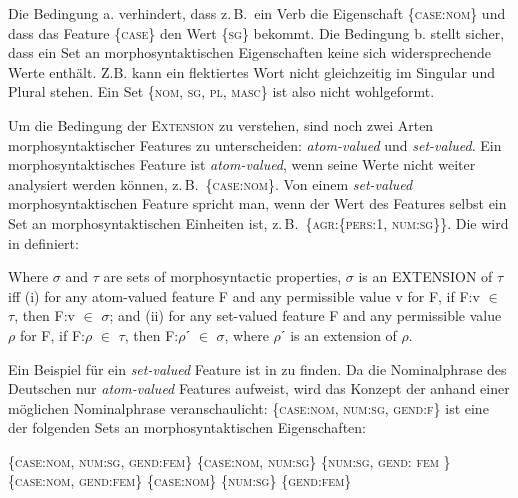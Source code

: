 Die Bedingung a. verhindert, dass z.\,B.\ ein Verb die Eigenschaft \{\textsc{case:nom}\} und dass das Feature \{\textsc{case}\} den Wert \{\textsc{sg}\} bekommt. Die Bedingung b. stellt sicher, dass ein Set an morphosyntaktischen Eigenschaften keine sich widersprechende Werte enthält. Z.B. kann ein flektiertes Wort nicht gleichzeitig im Singular und Plural stehen. Ein Set \{\textsc{nom, sg, pl, masc}\} ist also nicht wohlgeformt.

Um die Bedingung der \textsc{Extension} zu verstehen, sind noch zwei Arten morphosyntaktischer Features zu unterscheiden: \textit{atom-valued} und \textit{set-valued}. Ein morphosyntaktisches Feature ist \textit{atom-valued}, wenn seine Werte nicht weiter analysiert werden können, z.\,B.\ \{\textsc{case:nom}\}. Von einem \textit{set-valued} morphosyntaktischen Feature spricht man, wenn der Wert des Features selbst ein Set an morphosyntaktischen Einheiten ist, z.\,B.\ \{\textsc{agr:}\{\textsc{pers:1}, \textsc{num:sg}\}\}. Die  wird in  definiert:

\ea%
    \label{ex:key:17}
Where $\sigma $ and $\tau $ are  sets of morphosyntactic properties, $\sigma $ is an EXTENSION of $\tau $ iff (i) for any atom-valued feature F and any permissible value v for F, if F:v ${\in}$ $\tau $, then F:v ${\in}$ $\sigma $; and (ii) for any set-valued feature F and any permissible value $\rho $ for F, if F:$\rho $ ${\in}$ $\tau $, then F:$\rho $ˊ ${\in}$ $\sigma $, where $\rho $ˊ is an extension of $\rho $. \citep[41]{Stump2001}
    \z

Ein Beispiel für ein \textit{set-valued} Feature ist in \citet[41]{Stump2001} zu finden. Da die Nominalphrase des Deutschen nur \textit{atom-valued} Features aufweist, wird das Konzept der  anhand einer möglichen Nominalphrase veranschaulicht: \{\textsc{case:nom}, \textsc{num:sg}, \textsc{gend:f}\} ist eine  der folgenden Sets an morphosyntaktischen Eigenschaften:

\ea%
    \label{ex:key:18}
\ea \label{ex:key:18a} \{\textsc{case:nom, num:sg, gend:fem}\}
\ex \label{ex:key:18b} \{\textsc{case:nom, num:sg}\}          
\ex \label{ex:key:18c} \{\textsc{num:sg, gend: fem }\}        
\ex \label{ex:key:18d} \{\textsc{case:nom, gend:fem}\}        
\ex \label{ex:key:18e} \{\textsc{case:nom}\}                  
\ex \label{ex:key:18f} \{\textsc{num:sg}\}                    
\ex \label{ex:key:18g} \{\textsc{gend:fem}\}                  
    \z
    \z
   


